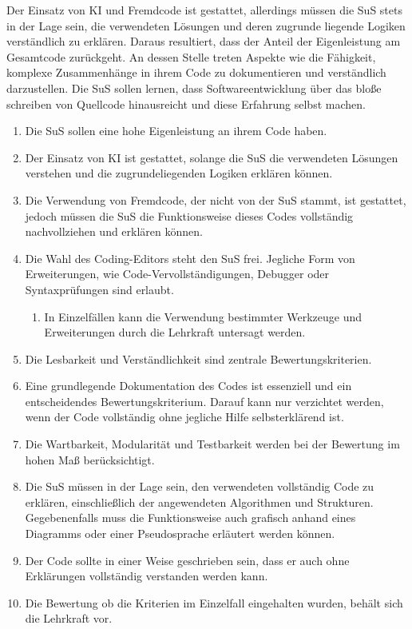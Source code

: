 \documentclass[a4paper,12pt]{article}
\begin{document}
Der Einsatz von KI und Fremdcode ist gestattet, allerdings müssen die SuS stets in der Lage sein, die verwendeten Lösungen und deren zugrunde liegende Logiken verständlich zu erklären. Daraus resultiert, dass der Anteil der Eigenleistung am Gesamtcode zurückgeht. An dessen Stelle treten Aspekte wie die Fähigkeit, komplexe Zusammenhänge in ihrem Code zu dokumentieren und verständlich darzustellen. Die SuS sollen lernen, dass Softwareentwicklung über das bloße schreiben von Quellcode hinausreicht und diese Erfahrung selbst machen.

\begin{enumerate}[label=\S\ \arabic*]
    \item Die SuS sollen eine hohe Eigenleistung an ihrem Code haben.
    \item Der Einsatz von KI ist gestattet, solange die SuS die verwendeten Lösungen verstehen und die zugrundeliegenden Logiken erklären können.
    \item Die Verwendung von Fremdcode, der nicht von der SuS stammt, ist gestattet, jedoch müssen die SuS die Funktionsweise dieses Codes vollständig nachvollziehen und erklären können.
    \item Die Wahl des Coding-Editors steht den SuS frei. Jegliche Form von Erweiterungen, wie Code-Vervollständigungen, Debugger oder Syntaxprüfungen sind erlaubt.
    \begin{enumerate}[label=\S\ \arabic*\alph*]
        \item In Einzelfällen kann die Verwendung bestimmter Werkzeuge und Erweiterungen durch die Lehrkraft untersagt werden.
    \end{enumerate}
    \item Die Lesbarkeit und Verständlichkeit sind zentrale Bewertungskriterien.
    \item Eine grundlegende Dokumentation des Codes ist essenziell und ein entscheidendes Bewertungskriterium. Darauf kann nur verzichtet werden, wenn der Code vollständig ohne jegliche Hilfe selbsterklärend ist.
    \item Die Wartbarkeit, Modularität und Testbarkeit werden bei der Bewertung im hohen Maß berücksichtigt.
    \item Die SuS müssen in der Lage sein, den verwendeten vollständig Code zu erklären, einschließlich der angewendeten Algorithmen und Strukturen. Gegebenenfalls muss die Funktionsweise auch grafisch anhand eines Diagramms oder einer Pseudosprache erläutert werden können.
    \item Der Code sollte in einer Weise geschrieben sein, dass er auch ohne Erklärungen vollständig verstanden werden kann.
    \item Die Bewertung ob die Kriterien im Einzelfall eingehalten wurden, behält sich die Lehrkraft vor.
\end{enumerate}
\end{document}
